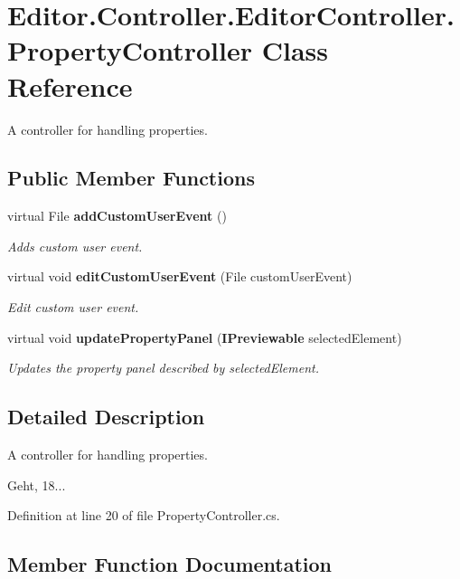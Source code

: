 \section{Editor.\-Controller.\-Editor\-Controller.\-Property\-Controller Class Reference}
\label{class_editor_1_1_controller_1_1_editor_controller_1_1_property_controller}


A controller for handling properties.  


\subsection*{Public Member Functions}
\begin{DoxyCompactItemize}
\item 
virtual File {\bf add\-Custom\-User\-Event} ()
\begin{DoxyCompactList}\small\item\em Adds custom user event. \end{DoxyCompactList}\item 
virtual void {\bf edit\-Custom\-User\-Event} (File custom\-User\-Event)
\begin{DoxyCompactList}\small\item\em Edit custom user event. \end{DoxyCompactList}\item 
virtual void {\bf update\-Property\-Panel} ({\bf I\-Previewable} selected\-Element)
\begin{DoxyCompactList}\small\item\em Updates the property panel described by selected\-Element. \end{DoxyCompactList}\end{DoxyCompactItemize}


\subsection{Detailed Description}
A controller for handling properties. 

Geht, 18... 

Definition at line 20 of file Property\-Controller.\-cs.



\subsection{Member Function Documentation}
